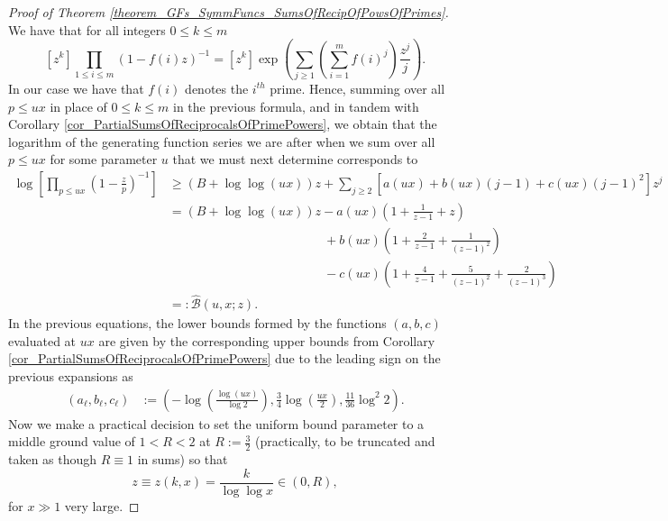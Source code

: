 \documentclass[11pt,reqno,a4letter]{article}
\numberwithin{figure}{section}
\numberwithin{table}{section}
\theoremstyle{plain}
\numberwithin{theorem}{section}
\theoremstyle{definition}
\newcommand{\NBRef}[1]{}
\begin{document}
\NBRef{A06-2020-04-26} 
\begin{proof}[Proof of Theorem \ref{theorem_GFs_SymmFuncs_SumsOfRecipOfPowsOfPrimes}] 
\label{proofOf_theorem_GFs_SymmFuncs_SumsOfRecipOfPowsOfPrimes} 
We have that for all integers $0 \leq k \leq m$
\begin{equation} 
\label{eqn_pf_tag_hSymmPolysGF} 
[z^k] \prod_{1 \leq i \leq m} (1-f(i) z)^{-1} = [z^k] \exp\left(\sum_{j \geq 1} 
     \left(\sum_{i=1}^m f(i)^j\right) \frac{z^j}{j}\right). 
\end{equation} 
In our case we have that $f(i)$ denotes the $i^{th}$ prime. 
Hence, summing over all $p \leq ux$ 
in place of $0 \leq k \leq m$ in the previous formula, and in tandem with 
Corollary \ref{cor_PartialSumsOfReciprocalsOfPrimePowers}, we obtain that the logarithm of the 
generating function series we are after when we sum over all $p \leq ux$ for some parameter 
$u$ that we must next determine corresponds to 
\begin{align*} 
\log\left[\prod_{p \leq ux} \left(1-\frac{z}{p}\right)^{-1}\right] & \geq (B + \log\log (ux)) z + 
     \sum_{j \geq 2} \left[a(ux) + b(ux)(j-1) + c(ux) (j-1)^2\right] z^j \\ 
     & = (B + \log\log (ux)) z - a(ux) \left(1 + \frac{1}{z-1} + z\right) \\ 
     & \phantom{= (B + \log\log (ux)) z\ } + 
     b(ux) \left( 
     1 + \frac{2}{z-1} + \frac{1}{(z-1)^2}\right) \\ 
     & \phantom{= (B + \log\log (ux)) z\ } - 
     c(ux) \left( 
     1 + \frac{4}{z-1} + \frac{5}{(z-1)^2} + \frac{2}{(z-1)^3}\right) \\ 
     & =: \widehat{\mathcal{B}}(u, x; z). 
\end{align*} 
In the previous equations, the lower bounds formed by the functions $(a,b,c)$ 
evaluated at $ux$ are 
given by the corresponding upper bounds from 
Corollary \ref{cor_PartialSumsOfReciprocalsOfPrimePowers} 
due to the leading sign on the previous expansions as 
\begin{align*} 
(a_{\ell}, b_{\ell}, c_{\ell}) & := \left(-\log\left(\frac{\log (ux)}{\log 2}\right), 
     \frac{3}{4} \log\left(\frac{ux}{2}\right), \frac{11}{36} \log^2 2\right). 
\end{align*} 
Now we make a practical decision to set the uniform bound parameter to a middle ground value of 
$1 < R < 2$ at $R := \frac{3}{2}$ 
(practically, to be truncated and taken as though $R \equiv 1$ in sums) so that 
$$z \equiv z(k, x) = \frac{k}{\log\log x} \in (0, R),$$ for $x \gg 1$ very large. 

\end{proof}
\end{document}

